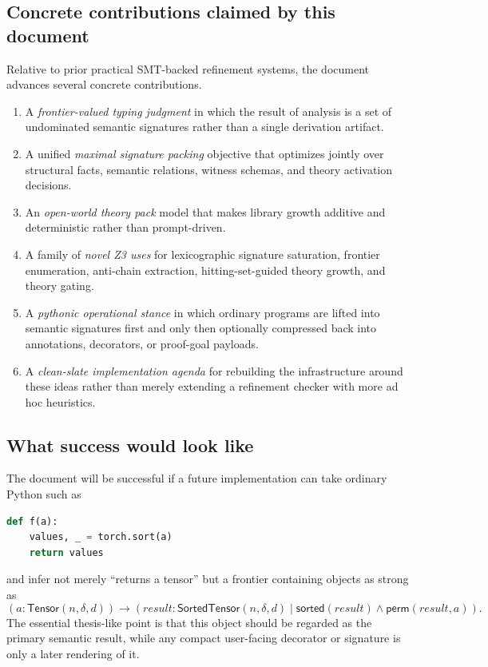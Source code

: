 \documentclass[11pt]{article}
\newcommand{\Zthree}{\textsc{Z3}}
\theoremstyle{definition}
\theoremstyle{plain}
\begin{document}
\subsection{Concrete contributions claimed by this document}
Relative to prior practical SMT-backed refinement systems, the document advances
several concrete contributions.
\begin{enumerate}[label=\textbf{C\arabic*.}]
  \item A \emph{frontier-valued typing judgment} in which the result of
  analysis is a set of undominated semantic signatures rather than a single
  derivation artifact.
  \item A unified \emph{maximal signature packing} objective that optimizes
  jointly over structural facts, semantic relations, witness schemas, and
  theory activation decisions.
  \item An \emph{open-world theory pack} model that makes library growth
  additive and deterministic rather than prompt-driven.
  \item A family of \emph{novel \Zthree{} uses} for lexicographic signature
  saturation, frontier enumeration, anti-chain extraction, hitting-set-guided
  theory growth, and theory gating.
  \item A \emph{pythonic operational stance} in which ordinary programs are
  lifted into semantic signatures first and only then optionally compressed back
  into annotations, decorators, or proof-goal payloads.
  \item A \emph{clean-slate implementation agenda} for rebuilding the
  infrastructure around these ideas rather than merely extending a refinement
  checker with more ad hoc heuristics.
\end{enumerate}

\subsection{What success would look like}
The document will be successful if a future implementation can take ordinary
Python such as
\begin{lstlisting}[style=deppy,language=Python]
def f(a):
    values, _ = torch.sort(a)
    return values
\end{lstlisting}
and infer not merely ``returns a tensor'' but a frontier containing objects as
strong as
\[
(a : \mathsf{Tensor}(n,\delta,d)) \to
(result : \mathsf{SortedTensor}(n,\delta,d) \mid
\mathsf{sorted}(result) \wedge \mathsf{perm}(result,a)).
\]
The essential thesis-like point is that this object should be regarded as the
primary semantic result, while any compact user-facing decorator or signature is
only a later rendering of it.
\end{document}
